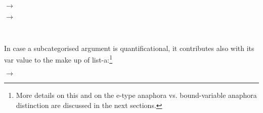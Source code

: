 \documentclass[output=paper
	        ,collection
	        ,collectionchapter
 	        ,biblatex
                ,babelshorthands
                ,newtxmath
                ,draftmode
                ,colorlinks, citecolor=brown
]{langscibook}
\begin{document}
 \begin{samepage}
\begin{exe}
\ex\label{lexconst}
\end{exe}

\avmfont{\sc}
\avmvalfont{\it}
\begin{avm}
\hfill
{}
\end{avm}
\begin{flushright}
$\longrightarrow$
\begin{avm}
\hfill
{}
\end{avm}
\end{flushright}

\begin{avm}
\hfill
{}
\end{avm}
\begin{flushright}
$\longrightarrow$
\begin{avm}
\hfill
{}
\end{avm}
\\

\end{flushright}
\end{samepage}

In case a subcategorised argument is quantificational, 
it contributes also with its {\sc var} value to the make up of
{\sc list-a}:\footnote{
More details on this and on the
e-type anaphora vs. bound-variable anaphora distinction are discussed
in the next sections.}

\begin{exe}
\ex\label{lexconst2}
\end{exe}

\avmfont{\sc}
\avmvalfont{\it}
\begin{avm}
\hfill
{}
\end{avm}
\begin{flushright}
$\longrightarrow$
\begin{avm}
\end{avm}
\end{flushright}
\avmoptions{}
\end{document}
